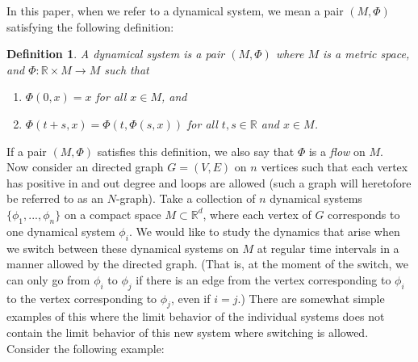 \documentclass[11pt]{article}
\newtheorem{defn}[thm]{Definition}
\begin{document}
In this paper, when we refer to a dynamical system, we mean a pair $(M, \Phi)$ satisfying the following definition:
\begin{defn}\label{dynsys}
A dynamical system is a pair $(M, \Phi)$ where $M$ is a metric space, and $\Phi:\mathbb{R}\times M\rightarrow M$ such that
\begin{enumerate}
\item $\Phi(0,x)=x$ for all $x\in M$, and
\item $\Phi(t+s,x)=\Phi(t,\Phi(s,x))$ for all $t,s \in \mathbb{R}$ and $x\in M$.
\end{enumerate}

\end{defn}
\noindent If a pair $(M,\Phi)$ satisfies this definition, we also say that $\Phi$ is a \emph{flow} on $M$. \\
\indent Now consider an directed graph $G=(V,E)$ on $n$ vertices such that each vertex has positive in and out degree and loops are allowed (such a graph will heretofore be referred to as an $N$-graph).  Take a collection of $n$ dynamical systems $\{\phi_1,...,\phi_n\}$ on a compact space $M \subset \mathbb{R}^d$, where each vertex of $G$ corresponds to one dynamical system $\phi_i$.  We would like to study the dynamics that arise when we switch between these dynamical systems on $M$ at regular time intervals in a manner allowed by the directed graph. (That is, at the moment of the switch, we can only go from $\phi_i$ to $\phi_j$ if there is an edge from the vertex corresponding to $\phi_i$ to the vertex corresponding to $\phi_j$, even if $i=j$.)  There are somewhat simple examples of this where the limit behavior of the individual systems does not contain the limit behavior of this new system where switching is allowed.  Consider the following example: \\
\end{document}
